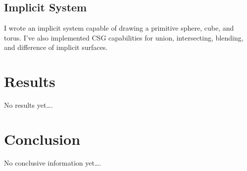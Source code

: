 \documentclass[conference]{acmsiggraph}
\begin{document}
\subsection{Implicit System}
I wrote an implicit system capable of drawing a primitive sphere, cube, and
torus. I've also implemented CSG
capabilities for union, intersecting, blending, and difference of implicit
surfaces.

\section{Results}
No results yet\ldots.


\section{Conclusion}
No conclusive information yet\ldots.




\end{document}

